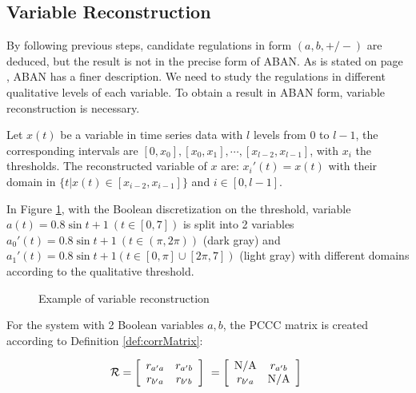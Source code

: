 \subsection{Variable Reconstruction}
By following previous steps, candidate regulations in form $(a,b,+/-)$ are deduced, but the result is not in the precise form of ABAN. 
As is stated on page \pageref{par:advantage}, ABAN has a finer description.
We need to study the regulations in different qualitative levels of each variable.
To obtain a result in ABAN form, variable reconstruction is necessary.

\begin{definition}
    Let $x(t)$ be a variable in time series data with $l$ levels from $0$ to $l-1$, the corresponding intervals are $[0,x_0],[x_0,x_1],\cdots,[x_{l-2},x_{l-1}]$, with $x_i$ the thresholds. 
    The reconstructed variable of $x$ are:
        $x_i'(t)=x(t)$ with their domain in $\{t|x(t)\in [x_{i-2},x_{i-1}]\}$ and $i\in [0,l-1]$.
\end{definition}

\begin{example}
In Figure \ref{varRec}, with the Boolean discretization on the threshold, variable $a(t)=0.8\sin t+1\ (t\in [0,7])$ is split into 2 variables $a_0'(t)=0.8\sin t+1\ (t\in (\pi,2\pi))$ (dark gray) and $a_1'(t)=0.8\sin t+1(t\in [0,\pi]\cup[2\pi,7])$ (light gray) with different domains according to the qualitative threshold.
\end{example}

\begin{figure}[ht]

\caption[Variable reconstruction]{Example of variable reconstruction}\label{varRec}
\end{figure}


For the system with 2 Boolean variables $a,b$, the PCCC matrix is created according to Definition \ref{def:corrMatrix}:


$$\mathcal{R}=\left[
\begin{array}{*{20}c}
r_{a'a} & r_{a'b}\\
r_{b'a} & r_{b'b} \\
\end{array}
\right]\ =\left[
\begin{array}{*{20}c}
{\rm N/A} & r_{a'b}\\
r_{b'a} & {\rm N/A} \\
\end{array}
\right]\ 
$$


